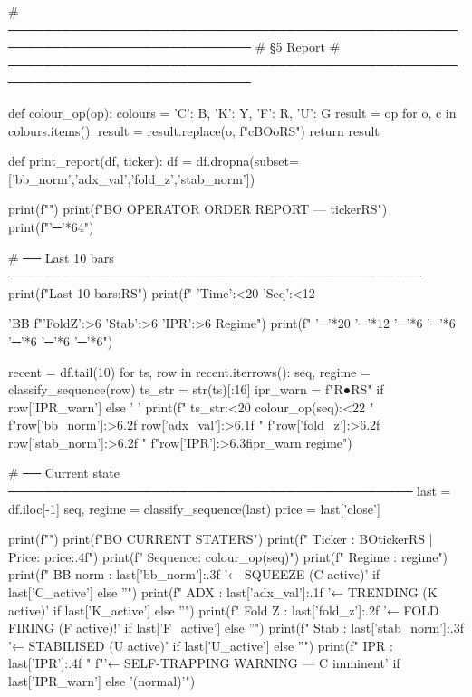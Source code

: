 {# ─────────────────────────────────────────────────────────────────────────────
# §5  Report
# ─────────────────────────────────────────────────────────────────────────────

def colour_op(op):
    colours = {'C': B, 'K': Y, 'F': R, 'U': G}
    result = op
    for o, c in colours.items():
        result = result.replace(o, f"{c}{BO}{o}{RS}")
    return result

def print_report(df, ticker):
    df = df.dropna(subset=['bb_norm','adx_val','fold_z','stab_norm'])

    print(f"")
    print(f"{BO}  OPERATOR ORDER REPORT — {ticker}{RS}")
    print(f"{'─'*64}")

    # ── Last 10 bars ──────────────────────────────────────────────
    print(f"Last 10 bars:{RS}")
    print(f"  {'Time':<20} {'Seq':<12} {'BB%
          f"{'FoldZ':>6} {'Stab':>6} {'IPR':>6}  Regime")
    print(f"  {'─'*20} {'─'*12} {'─'*6} {'─'*6} {'─'*6} {'─'*6} {'─'*6}")

    recent = df.tail(10)
    for ts, row in recent.iterrows():
        seq, regime = classify_sequence(row)
        ts_str = str(ts)[:16]
        ipr_warn = f"{R}●{RS}" if row['IPR_warn'] else ' '
        print(f"  {ts_str:<20} {colour_op(seq):<22} "
              f"{row['bb_norm']:>6.2f} {row['adx_val']:>6.1f} "
              f"{row['fold_z']:>6.2f} {row['stab_norm']:>6.2f} "
              f"{row['IPR']:>6.3f}{ipr_warn}  {regime}")

    # ── Current state ─────────────────────────────────────────────
    last = df.iloc[-1]
    seq, regime = classify_sequence(last)
    price = last['close']

    print(f"")
    print(f"{BO}  CURRENT STATE{RS}")
    print(f"  Ticker  : {BO}{ticker}{RS}  |  Price: {price:.4f}")
    print(f"  Sequence: {colour_op(seq)}")
    print(f"  Regime  : {regime}")
    print(f"  BB norm : {last['bb_norm']:.3f}  {'← SQUEEZE (C active)' if last['C_active'] else ''}")
    print(f"  ADX     : {last['adx_val']:.1f}   {'← TRENDING (K active)' if last['K_active'] else ''}")
    print(f"  Fold Z  : {last['fold_z']:.2f}   {'← FOLD FIRING (F active)!' if last['F_active'] else ''}")
    print(f"  Stab    : {last['stab_norm']:.3f}  {'← STABILISED (U active)' if last['U_active'] else ''}")
    print(f"  IPR     : {last['IPR']:.4f}  "
          f"{'← SELF-TRAPPING WARNING — C imminent' if last['IPR_warn'] else '(normal)'}")

}}
